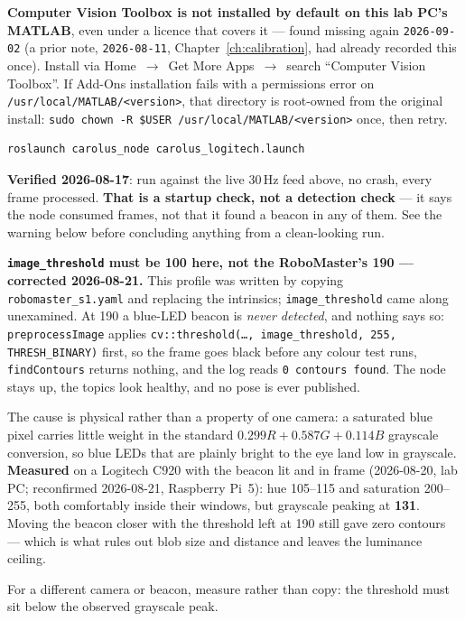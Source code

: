 \documentclass[11pt]{report}
\newenvironment{warningbox}%
  {\begin{lrbox}{\warnbox}\begin{minipage}{0.90\textwidth}}%
  {\end{minipage}\end{lrbox}%
   \begin{center}\fcolorbox{black}{codebg}{\usebox{\warnbox}}\end{center}}
\begin{document}
\begin{warningbox}
\textbf{Computer Vision Toolbox is not installed by default on this lab PC's
MATLAB}, even under a licence that covers it --- found missing again
\texttt{2026-09-02} (a prior note, \texttt{2026-08-11}, Chapter~\ref{ch:calibration},
had already recorded this once). Install via Home~$\to$~Get More Apps~$\to$~search
``Computer Vision Toolbox''. If Add-Ons installation fails with a permissions
error on \texttt{/usr/local/MATLAB/<version>}, that directory is root-owned
from the original install: \texttt{sudo chown -R \$USER
/usr/local/MATLAB/<version>} once, then retry.
\end{warningbox}

\begin{lstlisting}[style=shell]
roslaunch carolus_node carolus_logitech.launch
\end{lstlisting}

\textbf{Verified 2026-08-17}: run against the live 30\,Hz feed above, no
crash, every frame processed. \textbf{That is a startup check, not a
detection check} --- it says the node consumed frames, not that it found a
beacon in any of them. See the warning below before concluding anything from
a clean-looking run.

\begin{warningbox}
\textbf{\texttt{image\_threshold} must be 100 here, not the RoboMaster's 190
--- corrected 2026-08-21.} This profile was written by copying
\texttt{robomaster\_s1.yaml} and replacing the intrinsics;
\texttt{image\_threshold} came along unexamined. At 190 a blue-LED beacon is
\emph{never detected}, and nothing says so: \texttt{preprocessImage} applies
\texttt{cv::threshold(\ldots, image\_threshold, 255, THRESH\_BINARY)} first,
so the frame goes black before any colour test runs, \texttt{findContours}
returns nothing, and the log reads \texttt{0 contours found}. The node stays
up, the topics look healthy, and no pose is ever published.

The cause is physical rather than a property of one camera: a saturated blue
pixel carries little weight in the standard $0.299R + 0.587G + 0.114B$
grayscale conversion, so blue LEDs that are plainly bright to the eye land
low in grayscale. \textbf{Measured} on a Logitech C920 with the beacon lit
and in frame (2026-08-20, lab PC; reconfirmed 2026-08-21, Raspberry Pi~5):
hue 105--115 and saturation 200--255, both comfortably inside their windows,
but grayscale peaking at \textbf{131}. Moving the beacon closer with the
threshold left at 190 still gave zero contours --- which is what rules out
blob size and distance and leaves the luminance ceiling.

For a different camera or beacon, measure rather than copy: the threshold
must sit below the observed grayscale peak.
\end{warningbox}
\end{document}
